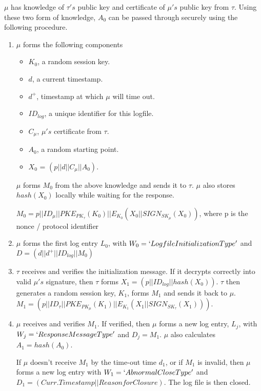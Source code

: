 \documentclass[12pt, letter]{article}
\begin{document}
$\mu$ has knowledge of $\tau's$ public key and certificate of $\mu's$ public key from $\tau$. Using these two form of knowledge, $A_0$ can be passed through securely using the following procedure.

\begin{enumerate}
    \item $\mu$ forms the following components
        \begin{itemize}
            \item $K_0$, a random session key. 
            \item $d$, a current timestamp. 
            \item $d^+$, timestamp at which $\mu$ will time out. 
            \item $ID_{log}$, a unique identifier for this logfile. 
            \item $C_{\mu}$, $\mu's$ certificate from $\tau$. 
            \item $A_0$, a random starting point. 
            \item $X_0$ = $(p || d || C_{\mu} || A_0)$. 
        \end{itemize}
        
        $\mu$ forms $M_0$ from the above knowledge and sends it to $\tau$. $\mu$ also stores $hash(X_0)$ locally while waiting for the response.
        
        $M_0 = p||ID_{\mu}||PKE_{PK_{\tau}}(K_0)||E_{K_0}(X_0||SIGN_{SK_{\mu}}(X_0))$, where p is the nonce / protocol identifier
        
        
    \item $\mu$ forms the first log entry $L_0$, with $W_0 = `LogfileInitializationType'$ and $D = (d||d^+||ID_{log}||M_0)$
    
    \item $\tau$ receives and verifies the initialization message. If it decrypts correctly into valid $\mu's$ signature, then $\tau$ forms 
    $X_1 = (p||ID_{log}||hash(X_0))$. $\tau$ then generates a random session key, $K_1$, forms $M_1$ and sends it back to $\mu$. $M_1 = (p||ID_{\tau}||PKE_{PK_{\mu}}(K_1)|| E_{K_1}(X_1||SIGN_{SK_\tau}(X_1)))$.
    
    \item $\mu$ receives and verifies $M_1$. If verified, then $\mu$ forms a new log entry, $L_j$, with $W_j=`ResponseMessageType'$ and $D_j = M_1$. $\mu$ also calculates $A_1 = hash(A_0)$.
    
    If $\mu$ doesn’t receive $M_1$ by the time-out time $d_1$, or if $M_1$ is invalid, then $\mu$ forms a new log entry with $W_1 = `AbnormalCloseType'$ and $D_1 = (Curr. Timestamp || Reason for Closure)$. The log file is then closed. 
\end{enumerate}
\end{document}
